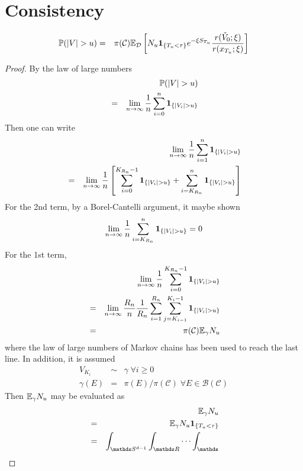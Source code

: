 \documentclass[aoas,preprint]{imsart}
\numberwithin{equation}{section}
\theoremstyle{plain}
\begin{document}
\section{Consistency}\label{sec:consistency}
\begin{theorem}
  \begin{eqnarray*}
    \mathbb{P}(|V| > u) &=& \pi(\mathcal C) \mathbb{E}_{\mathcal D} \left[
      N_u \mathbf{1}_{\{T_u < \tau\}} e^{-\xi S_{T_u}} {r(\tilde V_0; \xi)
        \over r(x_{T_u}; \xi)}
    \right]
  \end{eqnarray*}
\end{theorem}
\begin{proof}
  By the law of large numbers
  \begin{eqnarray*}
    && \mathbb{P}(|V| > u) \\
    &=& \lim_{n \to \infty} {1 \over n} \sum_{i=0}^n \mathbf{1}_{\{|V_i| > u\}}
  \end{eqnarray*}
  Then one can write
  \begin{eqnarray*}
    && \lim_{n \to \infty} {1 \over n} \sum_{i=1}^n \mathbf{1}_{\{|V_i| > u\}} \\
    &=& \lim_{n \to \infty} {1 \over n} \left[
      \sum_{i=0}^{K_{R_n}-1} \mathbf{1}_{\{|V_i| > u\}} + \sum_{i=K_{R_n}}^n \mathbf{1}_{\{|V_i| > u\}}
    \right]
  \end{eqnarray*}
  For the 2nd term, by a Borel-Cantelli argument, it maybe shown
  \[
  \lim_{n \to \infty} {1 \over n}\sum_{i=K_{R_n}}^n \mathbf{1}_{\{|V_i| > u\}} = 0
  \]
  For the 1st term,
  \begin{eqnarray*}
    && \lim_{n \to \infty} {1 \over n} \sum_{i=0}^{K_{R_n}-1} \mathbf{1}_{\{|V_i| >
      u\}}  \\
    &=& \lim_{n \to \infty} {R_n \over n} {1 \over R_n} \sum_{i=1}^{R_n}
    \sum_{j=K_{i-1}}^{K_i-1}\mathbf{1}_{\{|V_i| > u\}} \\
    &=& \pi(\mathcal C) \mathbb{E}_\gamma N_u
  \end{eqnarray*}
  where the law of large numbers of Markov chains has been used to reach
  the last line. In addition, it is assumed
  \begin{eqnarray*}
    V_{K_i} &\sim& \gamma \; \forall i \geq 0 \\
    \gamma(E) &=& \pi(E)/\pi(\mathcal C)\; \forall E \in \mathcal
    B(\mathcal C)
  \end{eqnarray*}
  Then $\mathbb{E}_\gamma N_u$ may be evaluated as
  \begin{eqnarray*}
    && \E_\gamma N_u \\
    &=& \E_\gamma N_u \1{T_u < \tau} \\
    &=& \int_{\mathds S^{d-1}} \int_{\mathds R} \cdots \int_{\mathds
}
\end{eqnarray*}
\end{proof}
\end{document}
